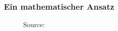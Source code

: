\documentclass{beamer}
\begin{document}
	\begin{frame}
        \frametitle{Ein mathematischer Ansatz}
        \begin{figure}[h]
        \caption{Source: \cite{one}}
        \end{figure}
	\end{frame}
\end{document}
